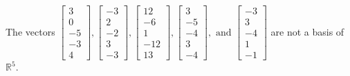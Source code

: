 \begin{exercise}
\begin{exerciseStatement}
  \end{exerciseStatement}
  \begin{exerciseAnswer}
   The vectors \(\left[\begin{array}{r}
3 \\
0 \\
-5 \\
-3 \\
4
\end{array}\right] , \left[\begin{array}{r}
-3 \\
2 \\
-2 \\
3 \\
-3
\end{array}\right] , \left[\begin{array}{r}
12 \\
-6 \\
1 \\
-12 \\
13
\end{array}\right] , \left[\begin{array}{r}
3 \\
-5 \\
-4 \\
3 \\
-4
\end{array}\right] , \text{ and } \left[\begin{array}{r}
-3 \\
3 \\
-4 \\
1 \\
-1
\end{array}\right]\) 
  	 are not  a basis of \(\mathbb{R}^5\).
  


  \end{exerciseAnswer}
\end{exercise}